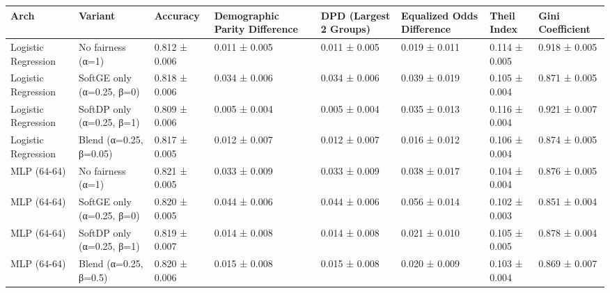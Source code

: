 \begin{tabular}{llllllll}
\toprule
Arch & Variant & Accuracy & Demographic Parity Difference & DPD (Largest 2 Groups) & Equalized Odds Difference & Theil Index & Gini Coefficient \\
\midrule
Logistic Regression & No fairness (α=1) & 0.812 ± 0.006 & 0.011 ± 0.005 & 0.011 ± 0.005 & 0.019 ± 0.011 & 0.114 ± 0.005 & 0.918 ± 0.005 \\
Logistic Regression & SoftGE only (α=0.25, β=0) & 0.818 ± 0.006 & 0.034 ± 0.006 & 0.034 ± 0.006 & 0.039 ± 0.019 & 0.105 ± 0.004 & 0.871 ± 0.005 \\
Logistic Regression & SoftDP only (α=0.25, β=1) & 0.809 ± 0.006 & 0.005 ± 0.004 & 0.005 ± 0.004 & 0.035 ± 0.013 & 0.116 ± 0.004 & 0.921 ± 0.007 \\
Logistic Regression & Blend (α=0.25, β=0.05) & 0.817 ± 0.005 & 0.012 ± 0.007 & 0.012 ± 0.007 & 0.016 ± 0.012 & 0.106 ± 0.004 & 0.874 ± 0.005 \\
MLP (64-64) & No fairness (α=1) & 0.821 ± 0.005 & 0.033 ± 0.009 & 0.033 ± 0.009 & 0.038 ± 0.017 & 0.104 ± 0.004 & 0.876 ± 0.005 \\
MLP (64-64) & SoftGE only (α=0.25, β=0) & 0.820 ± 0.005 & 0.044 ± 0.006 & 0.044 ± 0.006 & 0.056 ± 0.014 & 0.102 ± 0.003 & 0.851 ± 0.004 \\
MLP (64-64) & SoftDP only (α=0.25, β=1) & 0.819 ± 0.007 & 0.014 ± 0.008 & 0.014 ± 0.008 & 0.021 ± 0.010 & 0.105 ± 0.005 & 0.878 ± 0.004 \\
MLP (64-64) & Blend (α=0.25, β=0.5) & 0.820 ± 0.006 & 0.015 ± 0.008 & 0.015 ± 0.008 & 0.020 ± 0.009 & 0.103 ± 0.004 & 0.869 ± 0.007 \\
\bottomrule
\end{tabular}
